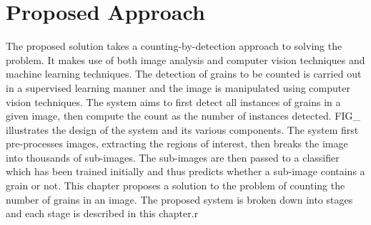 


\def\baselinestretch{1}

\chapter{Proposed Approach}

\def\baselinestretch{1.66}



The proposed solution takes a counting-by-detection approach to solving the problem. It makes use of both image analysis and computer vision techniques and machine learning techniques. The detection of grains to be counted is carried out in a supervised learning manner and the image is manipulated using computer vision techniques. The system aims to first detect all instances of grains in a given image, then compute the count as the number of instances detected. FIG\_ illustrates the design of the system and its various components. The system first pre-processes images, extracting the regions of interest, then breaks the image into  thousands of sub-images. The sub-images are then passed to a classifier which has been trained initially and thus predicts whether a sub-image contains a grain or not. This chapter proposes a solution to the problem of counting the number of grains in an image. The proposed system is broken down into stages and each stage is described in this chapter.r

\smallskip

